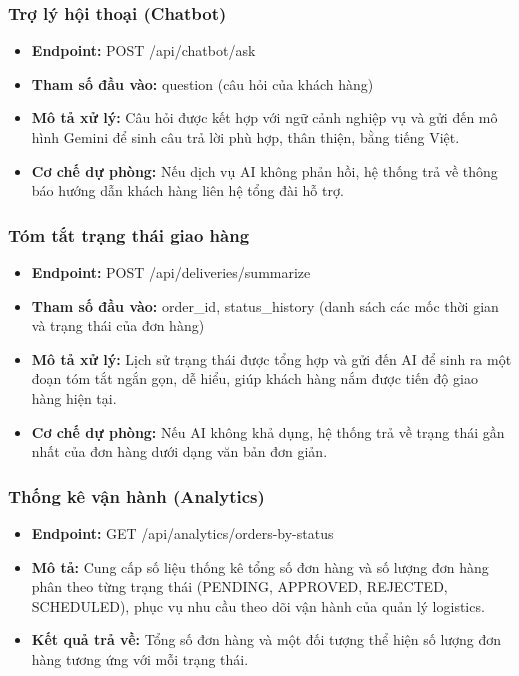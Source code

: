 \subsubsection{Trợ lý hội thoại (Chatbot)}

\begin{itemize}
\item
  \textbf{Endpoint:} POST /api/chatbot/ask
\item
  \textbf{Tham số đầu vào:} question (câu hỏi của khách hàng)
\item
  \textbf{Mô tả xử lý:} Câu hỏi được kết hợp với ngữ cảnh nghiệp vụ và gửi đến mô hình Gemini để sinh câu trả lời phù hợp, thân thiện, bằng tiếng Việt.
\item
  \textbf{Cơ chế dự phòng:} Nếu dịch vụ AI không phản hồi, hệ thống trả về thông báo hướng dẫn khách hàng liên hệ tổng đài hỗ trợ.
\end{itemize}

\subsubsection{Tóm tắt trạng thái giao hàng}

\begin{itemize}
\item
  \textbf{Endpoint:} POST /api/deliveries/summarize
\item
  \textbf{Tham số đầu vào:} order\_id, status\_history (danh sách các mốc thời gian và trạng thái của đơn hàng)
\item
  \textbf{Mô tả xử lý:} Lịch sử trạng thái được tổng hợp và gửi đến AI để sinh ra một đoạn tóm tắt ngắn gọn, dễ hiểu, giúp khách hàng nắm được tiến độ giao hàng hiện tại.
\item
  \textbf{Cơ chế dự phòng:} Nếu AI không khả dụng, hệ thống trả về trạng thái gần nhất của đơn hàng dưới dạng văn bản đơn giản.
\end{itemize}

\subsubsection{Thống kê vận hành (Analytics)}

\begin{itemize}
\item
  \textbf{Endpoint:} GET /api/analytics/orders-by-status
\item
  \textbf{Mô tả:} Cung cấp số liệu thống kê tổng số đơn hàng và số lượng đơn hàng phân theo từng trạng thái (PENDING, APPROVED, REJECTED, SCHEDULED), phục vụ nhu cầu theo dõi vận hành của quản lý logistics.
\item
  \textbf{Kết quả trả về:} Tổng số đơn hàng và một đối tượng thể hiện số lượng đơn hàng tương ứng với mỗi trạng thái.
\end{itemize}